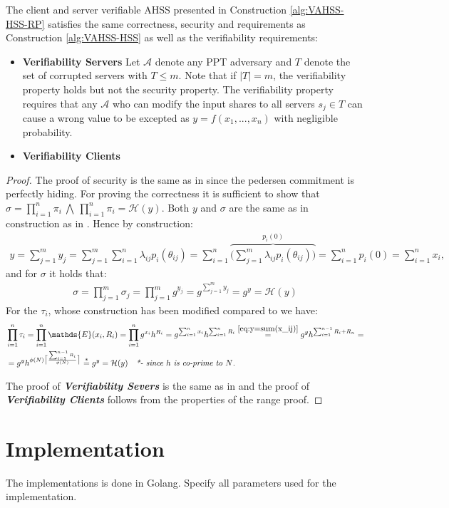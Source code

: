 \begin{thm}
\vspace{10pt}
The client and server verifiable AHSS presented in Construction \ref{alg:VAHSS-HSS-RP} satisfies the same correctness, security and requirements as Construction \ref{alg:VAHSS-HSS} as well as the verifiability requirements: 
\begin{itemize}
 \item \textbf{Verifiability Servers}  Let $\mathcal{A}$ denote any PPT  adversary and $T$ denote the set of corrupted servers with $T\leq m$. Note that if $|T|=m$, the verifiability property holds but not the security property. The verifiability property requires that any $\mathcal{A}$ who can modify the input shares to all servers $s_j\in T$ can cause a wrong value to be excepted as $y=f(x_1,...,x_n)$ with negligible probability.  
 \item  \textbf{Verifiability Clients} 
\end{itemize} 
\end{thm}
\begin{proof}
The proof of security is the same as in \cite{SumItUp} since the pedersen commitment is perfectly hiding. For proving the correctness it is sufficient to show that $\sigma= \prod_{i=1}^n \pi_i \:\bigwedge\: \prod_{i=1}^n \pi_i = \mathcal{H}(y)$. Both $y$ and $\sigma$ are the same as in construction as in \cite{VAHSS}. Hence by construction:
\begin{align}
    \label{eq:y=sum(x_ij)}
    y = \sum_{j=1}^m y_j= \sum_{j=1}^m \sum_{i=1}^n \lambda_{ij}p_i(\theta_{ij}) = \sum_{i=1}^n \overbrace{ \Big (\sum_{j=1}^m \lambda_{ij}p_i(\theta_{ij}) \Big)}^{ p_i(0)} = \sum_{i=1}^n p_i(0) = \sum_{i=1}^n x_i,
\end{align}
and for $\sigma$ it holds that:
\begin{align*}
    \sigma = \prod_{j=1}^m \sigma_j = \prod_{j=1}^m g^{y_j} = g^{\sum_{j=1}^my_j} =g^y = \mathcal{H}(y)
\end{align*}
For the $\tau_i$, whose construction has been modified compared to \cite{VAHSS} we have:
\begin{align*}
    &\prod_{i=1}^n \tau_i = \prod_{i=1}^n \mathds{E}(x_i,R_i)= \prod_{i=1}^n g^{x_i}h^{R_i} = g^{\sum_{i=1}^n x_i } h^{\sum_{i=1}^n R_i} \overset{\eqref{eq:y=sum(x_ij)}}{=} g^y h^{\sum_{i=1}^{n-1} R_i+R_n} = \\ 
    &= g^y h^{ \phi(N)\big\lceil \frac{\sum_{i=1}^{n-1}R_i}{\phi(N) }\big\rceil}  \overset{*}{=} g^y = \mathcal{H}(y) \quad \textit{*- since $h$ is co-prime to $N$.}
\end{align*}

The proof of \textit{\textbf{Verifiability Severs}} is the same as in \cite{SumItUp} and the proof of \textit{\textbf{Verifiability Clients}} follows from the properties of  the range proof.
\end{proof}

\section{Implementation}
The implementations is done in Golang. Specify all parameters used for the implementation. 